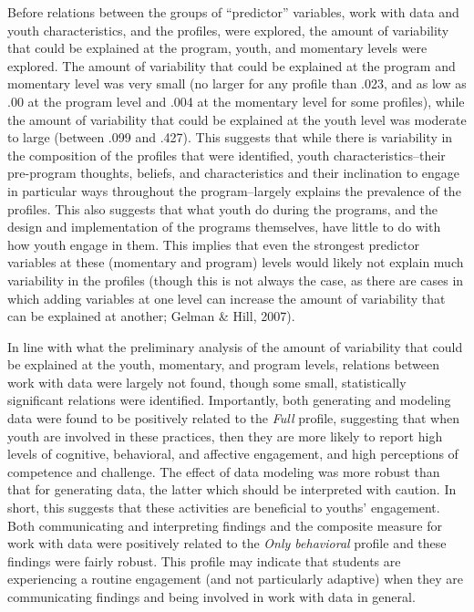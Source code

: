 \documentclass[]{book}
\theoremstyle{definition}
\theoremstyle{definition}
\theoremstyle{definition}
\theoremstyle{remark}
\begin{document}
Before relations between the groups of ``predictor'' variables, work
with data and youth characteristics, and the profiles, were explored,
the amount of variability that could be explained at the program, youth,
and momentary levels were explored. The amount of variability that could
be explained at the program and momentary level was very small (no
larger for any profile than .023, and as low as .00 at the program level
and .004 at the momentary level for some profiles), while the amount of
variability that could be explained at the youth level was moderate to
large (between .099 and .427). This suggests that while there is
variability in the composition of the profiles that were identified,
youth characteristics--their pre-program thoughts, beliefs, and
characteristics and their inclination to engage in particular ways
throughout the program--largely explains the prevalence of the profiles.
This also suggests that what youth do during the programs, and the
design and implementation of the programs themselves, have little to do
with how youth engage in them. This implies that even the strongest
predictor variables at these (momentary and program) levels would likely
not explain much variability in the profiles (though this is not always
the case, as there are cases in which adding variables at one level can
increase the amount of variability that can be explained at another;
Gelman \& Hill, 2007).

In line with what the preliminary analysis of the amount of variability
that could be explained at the youth, momentary, and program levels,
relations between work with data were largely not found, though some
small, statistically significant relations were identified. Importantly,
both generating and modeling data were found to be positively related to
the \emph{Full} profile, suggesting that when youth are involved in
these practices, then they are more likely to report high levels of
cognitive, behavioral, and affective engagement, and high perceptions of
competence and challenge. The effect of data modeling was more robust
than that for generating data, the latter which should be interpreted
with caution. In short, this suggests that these activities are
beneficial to youths' engagement. Both communicating and interpreting
findings and the composite measure for work with data were positively
related to the \emph{Only behavioral} profile and these findings were
fairly robust. This profile may indicate that students are experiencing
a routine engagement (and not particularly adaptive) when they are
communicating findings and being involved in work with data in general.
\end{document}
